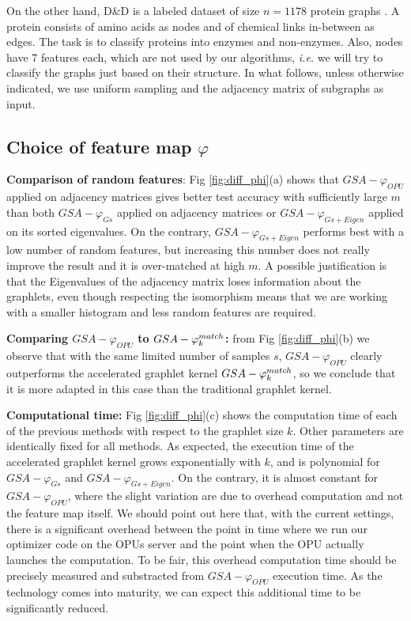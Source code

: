 \documentclass{article}
\begin{document}
On the other hand, D\&D is a labeled dataset of size $n=1178$ protein graphs \cite{DD_ref}. A protein consists of amino acids as nodes and of chemical links in-between as edges. The task is to classify proteins into enzymes and non-enzymes. Also, nodes have 7 features each, which are not used by our algorithms, \emph{i.e.} we will try to classify the graphs just based on their structure. In what follows, unless otherwise indicated, we use uniform sampling and the adjacency matrix of subgraphs as input.

\subsection{Choice of feature map $\varphi$}
\textbf{Comparison of random features}: Fig \ref{fig:diff_phi}(a) shows  that $GSA-\varphi_{OPU}$ applied on adjacency matrices gives better test accuracy with sufficiently large $m$ than both $GSA-\varphi_{Gs}$ applied on adjacency matrices or $GSA-\varphi_{Gs+Eigen}$ applied on its sorted eigenvalues. On the contrary, $GSA-\varphi_{Gs+Eigen}$ performs best with a low number of random features, but increasing this number does not really improve the result and it is over-matched at high $m$. A possible justification is that the Eigenvalues of the adjacency matrix loses information about the graphlets, even though respecting the isomorphism means that we are working with a smaller histogram and less random features are required.

\noindent\textbf{Comparing $GSA-\varphi_{OPU}$ to $GSA-\varphi^{match}_k$:} from Fig \ref{fig:diff_phi}(b) we observe that  with the same limited number of samples $s$, $GSA-\varphi_{OPU}$ clearly outperforms the accelerated graphlet kernel $GSA-\varphi^{match}_k$, so we conclude that it is more adapted in this case than the traditional graphlet kernel.

\noindent\textbf{Computational time:} Fig \ref{fig:diff_phi}(c) shows the computation time of each of the previous methods with respect to the graphlet size $k$. Other parameters are identically fixed for all methods. As expected, the execution time of the accelerated graphlet kernel grows exponentially with  $k$, and is polynomial for $GSA-\varphi_{Gs}$ and $GSA-\varphi_{Gs+Eigen}$. On the contrary, it is almost constant for $GSA-\varphi_{OPU}$, where the slight variation are due to overhead computation and not the feature map itself. We should point out here that, with the current settings, there is a significant overhead between the point in time where we run our optimizer code on the OPUs server and the point when the OPU actually launches the computation. To be fair, this overhead computation time should be precisely measured and substracted from $GSA-\varphi_{OPU}$ execution time. As the technology comes into maturity, we can expect this additional time to be significantly reduced. 
\end{document}
